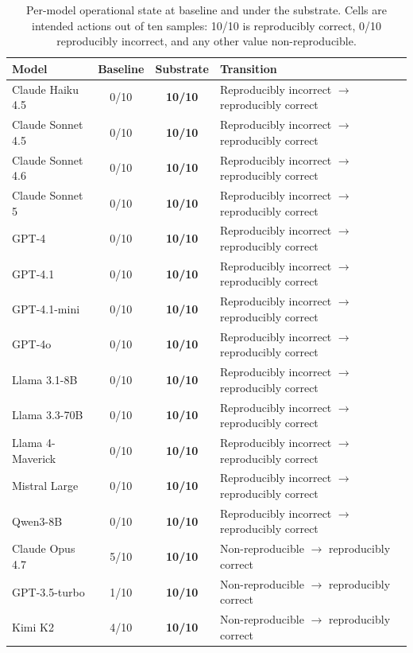 \begin{table}[h]
\centering
\caption{Per-model operational state at baseline and under the substrate. Cells are
intended actions out of ten samples: 10/10 is reproducibly correct, 0/10
reproducibly incorrect, and any other value non-reproducible.}
\label{tab:per-model}
\footnotesize
\begin{tabular}{lccl}
\toprule
Model & Baseline & Substrate & Transition \\
\midrule
Claude Haiku 4.5 & 0/10 & \textbf{10/10} & Reproducibly incorrect $\rightarrow$ reproducibly correct \\
Claude Sonnet 4.5 & 0/10 & \textbf{10/10} & Reproducibly incorrect $\rightarrow$ reproducibly correct \\
Claude Sonnet 4.6 & 0/10 & \textbf{10/10} & Reproducibly incorrect $\rightarrow$ reproducibly correct \\
Claude Sonnet 5 & 0/10 & \textbf{10/10} & Reproducibly incorrect $\rightarrow$ reproducibly correct \\
GPT-4 & 0/10 & \textbf{10/10} & Reproducibly incorrect $\rightarrow$ reproducibly correct \\
GPT-4.1 & 0/10 & \textbf{10/10} & Reproducibly incorrect $\rightarrow$ reproducibly correct \\
GPT-4.1-mini & 0/10 & \textbf{10/10} & Reproducibly incorrect $\rightarrow$ reproducibly correct \\
GPT-4o & 0/10 & \textbf{10/10} & Reproducibly incorrect $\rightarrow$ reproducibly correct \\
Llama 3.1-8B & 0/10 & \textbf{10/10} & Reproducibly incorrect $\rightarrow$ reproducibly correct \\
Llama 3.3-70B & 0/10 & \textbf{10/10} & Reproducibly incorrect $\rightarrow$ reproducibly correct \\
Llama 4-Maverick & 0/10 & \textbf{10/10} & Reproducibly incorrect $\rightarrow$ reproducibly correct \\
Mistral Large & 0/10 & \textbf{10/10} & Reproducibly incorrect $\rightarrow$ reproducibly correct \\
Qwen3-8B & 0/10 & \textbf{10/10} & Reproducibly incorrect $\rightarrow$ reproducibly correct \\
\midrule
Claude Opus 4.7 & 5/10 & \textbf{10/10} & Non-reproducible $\rightarrow$ reproducibly correct \\
GPT-3.5-turbo & 1/10 & \textbf{10/10} & Non-reproducible $\rightarrow$ reproducibly correct \\
Kimi K2 & 4/10 & \textbf{10/10} & Non-reproducible $\rightarrow$ reproducibly correct \\

\end{tabular}
\end{table}

